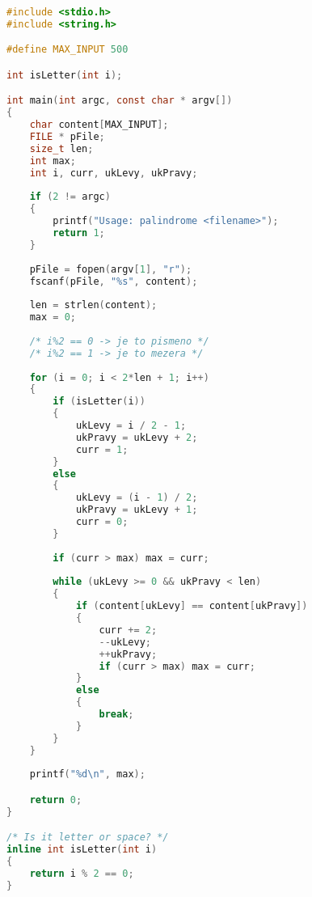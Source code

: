 \documentclass[12pt,a4paper]{article}
\begin{document}
\begin{lstlisting}[language=c]
#include <stdio.h>
#include <string.h>

#define MAX_INPUT 500

int isLetter(int i);

int main(int argc, const char * argv[])
{
    char content[MAX_INPUT];
    FILE * pFile;
    size_t len;
    int max;
    int i, curr, ukLevy, ukPravy;
    
    if (2 != argc)
    {
        printf("Usage: palindrome <filename>");
        return 1;
    }
                
    pFile = fopen(argv[1], "r");
    fscanf(pFile, "%s", content);
        
    len = strlen(content);
    max = 0;
    
    /* i%2 == 0 -> je to pismeno */
    /* i%2 == 1 -> je to mezera */
    
    for (i = 0; i < 2*len + 1; i++)
    {
        if (isLetter(i))
        {
            ukLevy = i / 2 - 1;
            ukPravy = ukLevy + 2;
            curr = 1;
        }
        else
        {
            ukLevy = (i - 1) / 2;
            ukPravy = ukLevy + 1;
            curr = 0;
        }
        
        if (curr > max) max = curr;
        
        while (ukLevy >= 0 && ukPravy < len)
        {
            if (content[ukLevy] == content[ukPravy])
            {
                curr += 2;
                --ukLevy;
                ++ukPravy;
                if (curr > max) max = curr;
            }
            else
            {
                break;
            }
        }
    }
    
    printf("%d\n", max);

    return 0;
}

/* Is it letter or space? */
inline int isLetter(int i)
{
    return i % 2 == 0;
}

\end{lstlisting}
\end{document}
